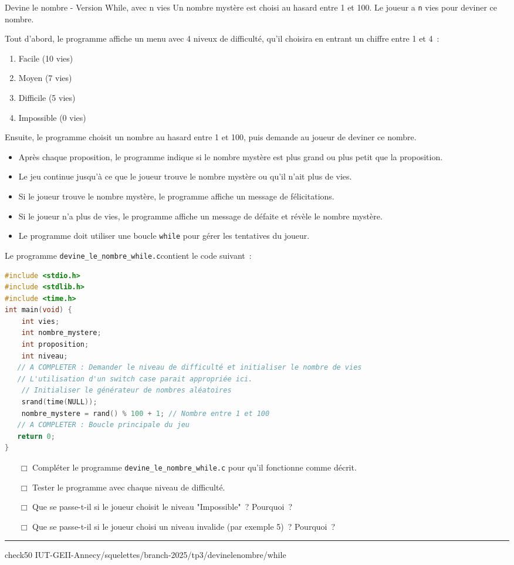 
\begin{UPSTIManipulation}{Devine le nombre - Version While, avec n vies}
	Un nombre mystère est choisi au hasard entre 1 et 100. Le joueur a \texttt{n} vies pour deviner ce nombre.

	Tout d'abord, le programme affiche un menu avec 4 niveux de difficulté, qu'il choisira en entrant un chiffre entre 1 et 4 :
	\begin{enumerate}
		\item Facile (10 vies)
		\item Moyen (7 vies)
		\item Difficile (5 vies)
		\item Impossible (0 vies)
	\end{enumerate}
	Ensuite, le programme choisit un nombre au hasard entre 1 et 100, puis demande au joueur de deviner ce nombre.

	\begin{itemize}
		\item Après chaque proposition, le programme indique si le nombre mystère est plus grand ou plus petit que la proposition.
		\item Le jeu continue jusqu'à ce que le joueur trouve le nombre mystère ou qu'il n'ait plus de vies.
		\item Si le joueur trouve le nombre mystère, le programme affiche un message de félicitations.
		\item Si le joueur n'a plus de vies, le programme affiche un message de défaite et révèle le nombre mystère.
		\item Le programme doit utiliser une boucle \texttt{while} pour gérer les tentatives du joueur.
	\end{itemize}
	Le programme \texttt{devine\_le\_nombre\_while.c}contient le code suivant :
	\begin{lstlisting}[language=c]
#include <stdio.h>
#include <stdlib.h>
#include <time.h>
int main(void) {
    int vies;
    int nombre_mystere;
    int proposition;
    int niveau;
   // A COMPLETER : Demander le niveau de difficulté et initialiser le nombre de vies
   // L'utilisation d'un switch case parait appropriée ici. 
    // Initialiser le générateur de nombres aléatoires
    srand(time(NULL));
    nombre_mystere = rand() % 100 + 1; // Nombre entre 1 et 100
   // A COMPLETER : Boucle principale du jeu
   return 0;
}
\end{lstlisting}
	\begin{itemize}
		\item[$\Box$] Compléter le programme \texttt{devine\_le\_nombre\_while.c} pour qu'il fonctionne comme décrit.
		\item[$\Box$] Tester le programme avec chaque niveau de difficulté.
		\item[$\Box$] Que se passe-t-il si le joueur choisit le niveau "Impossible" ? Pourquoi ?
		\item[$\Box$] Que se passe-t-il si le joueur choisi un niveau invalide (par exemple 5) ? Pourquoi ?
	\end{itemize}
	\hrule
	check50 IUT-GEII-Annecy/squelettes/branch-2025/tp3/devinelenombre/while
\end{UPSTIManipulation}


